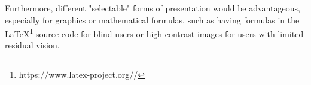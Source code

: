 Furthermore, different "selectable" forms of presentation would be advantageous, especially for graphics or mathematical formulas, such as having formulas in the LaTeX\footnote{https://www.latex-project.org//} source code for blind users or high-contrast images for users with limited residual vision. 

